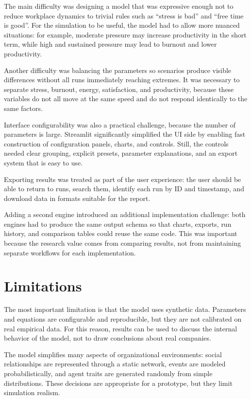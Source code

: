 \documentclass[12pt,a4paper]{article}
\begin{document}
The main difficulty was designing a model that was expressive enough not to reduce workplace dynamics to trivial rules such as ``stress is bad'' and ``free time is good''. For the simulation to be useful, the model had to allow more nuanced situations: for example, moderate pressure may increase productivity in the short term, while high and sustained pressure may lead to burnout and lower productivity.

Another difficulty was balancing the parameters so scenarios produce visible differences without all runs immediately reaching extremes. It was necessary to separate stress, burnout, energy, satisfaction, and productivity, because these variables do not all move at the same speed and do not respond identically to the same factors.

Interface configurability was also a practical challenge, because the number of parameters is large. Streamlit significantly simplified the UI side by enabling fast construction of configuration panels, charts, and controls. Still, the controls needed clear grouping, explicit presets, parameter explanations, and an export system that is easy to use.

Exporting results was treated as part of the user experience: the user should be able to return to runs, search them, identify each run by ID and timestamp, and download data in formats suitable for the report.

Adding a second engine introduced an additional implementation challenge: both engines had to produce the same output schema so that charts, exports, run history, and comparison tables could reuse the same code. This was important because the research value comes from comparing results, not from maintaining separate workflows for each implementation.

\section{Limitations}

The most important limitation is that the model uses synthetic data. Parameters and equations are configurable and reproducible, but they are not calibrated on real empirical data. For this reason, results can be used to discuss the internal behavior of the model, not to draw conclusions about real companies.

The model simplifies many aspects of organizational environments: social relationships are represented through a static network, events are modeled probabilistically, and agent traits are generated randomly from simple distributions. These decisions are appropriate for a prototype, but they limit simulation realism.
\end{document}
